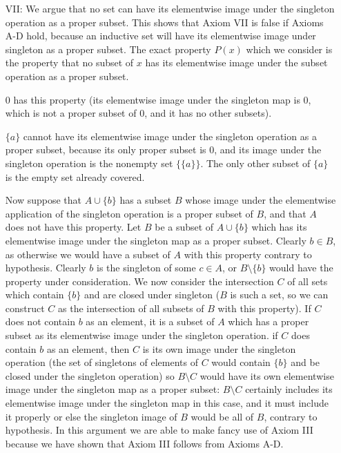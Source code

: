 \documentclass[12pt]{article}
\begin{document}
\begin{enumerate}
\begin{description}
\begin{enumerate}
\item[VII:]  We argue that no set can have its elementwise image under the singleton operation as a proper subset.  This shows that Axiom VII is false if Axioms A-D hold, because
an inductive set will have its elementwise image under singleton as a proper subset.
The exact property $P(x)$ which we consider is the property that no subset of $x$ has its elementwise image under the subset operation as a proper subset.   

0 has this property (its elementwise image under the singleton map is 0, which is not a proper subset of 0, and it has no other subsets).

$\{a\}$ cannot have its elementwise image under the singleton operation as a proper subset, because its only proper subset is 0, and its image under the singleton operation is the nonempty set $\{\{a\}\}$.  The only other subset of $\{a\}$ is the empty set already covered.  

Now suppose that $A \cup \{b\}$ has a subset $B$ whose image under the elementwise application of the singleton operation is a proper subset of $B$, and that $A$ does not have this property.  Let $B$ be a subset of $A \cup \{b\}$ which has its elementwise image under the singleton map as a proper subset.  Clearly $b \in B$, as otherwise we would have a subset of $A$ with this property contrary to hypothesis.  Clearly $b$ is the singleton of some $c \in A$, or $B \setminus \{b\}$ would have the property under consideration.  We now consider the intersection $C$ of all sets which contain $\{b\}$ and are closed under singleton ($B$ is such a set, so we can construct $C$ as the intersection of all subsets of $B$ with this property).  If $C$ does not contain $b$ as an element, it is a subset of $A$ which has a proper subset as its elementwise image under the singleton operation.  if $C$ does contain $b$ as an element, then $C$ is its own image under the singleton operation (the set of singletons of elements of $C$ would contain $\{b\}$ and be closed under the singleton operation) so $B \setminus C$ would have its own elementwise image under the singleton map as a proper subset:  $B \setminus C$ certainly includes its elementwise image under the singleton map in this case, and it must include it properly or else the singleton image of $B$ would be all of $B$, contrary to hypothesis.  In this argument we are able to make fancy use of Axiom III because we have shown that Axiom III follows from Axioms A-D.




\end{enumerate}
\end{description}
\end{enumerate}
\end{document}
